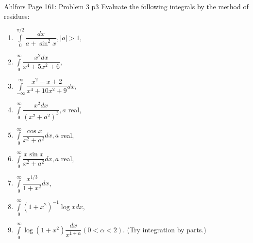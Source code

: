 \documentclass[a4paper, 11pt]{article}
\begin{document}
	
	
	\begin{problem}{%
			Ahlfors Page 161: Problem 3
		}{p3%
		}
Evaluate the following integrals by the method of residues:
\begin{multicols}{2}
	\begin{enumerate}[label=(\alph*)]
		\item ${\int\limits_0^{\pi / 2} \dfrac{d x}{a+\sin ^2 x},|a|>1}$,
		\item ${\int\limits_0^{\infty} \dfrac{x^2 d x}{x^4+5 x^2+6}}$,
		\item ${\int\limits_{-\infty}^{\infty} \dfrac{x^2-x+2}{x^4+10 x^2+9} d x}$,
		\item ${\int\limits_0^{\infty} \dfrac{x^2 d x}{\left(x^2+a^2\right)^3}, a}$ real,
		\item ${\int\limits_0^{\infty} \dfrac{\cos x}{x^2+a^2} d x}, a$  real,
		\item ${\int\limits_0^{\infty} \dfrac{x \sin x}{x^2+a^2} d x, a}$ real,
		\item ${\int\limits_0^{\infty} \dfrac{x^{1 / 3}}{1+x^2} d x}$,
		\item ${\int\limits_0^{\infty}\left(1+x^2\right)^{-1} \log x d x}$,
		\item ${\int\limits_0^{\infty} \log \left(1+x^2\right) \dfrac{d x}{x^{1+\alpha}}(0<\alpha<2)}$. (Try integration by parts.)
	\end{enumerate}
\end{multicols}	\end{problem}
	\pagebreak
	
\end{document}
